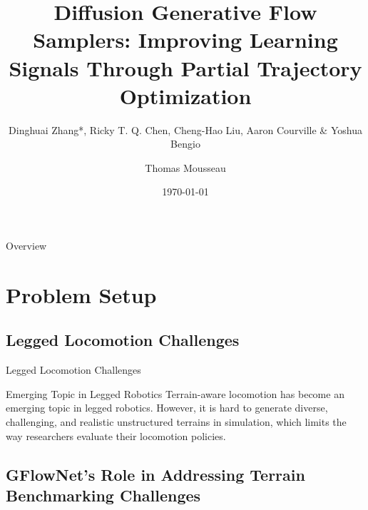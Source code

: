 \documentclass[aspectratio=169,xcolor=dvipsnames]{beamer}
\title{Diffusion Generative Flow Samplers: Improving Learning Signals Through Partial Trajectory Optimization}
\subtitle{Dinghuai Zhang*, Ricky T. Q. Chen, Cheng-Hao Liu, Aaron Courville \& Yoshua Bengio}
\author{Thomas Mousseau}
\date{\today} %
\begin{document}
\begin{frame}
    \vspace*{-2cm}
    \titlepage
\end{frame}

\begin{frame}{Overview}
    \tableofcontents
\end{frame}

\section{Problem Setup}

\subsection{Legged Locomotion Challenges}

\begin{frame}{Legged Locomotion Challenges}
    \begin{block}{Emerging Topic in Legged Robotics}
        Terrain-aware locomotion has become an emerging topic in legged robotics. However, it is hard to generate diverse, challenging, and realistic unstructured terrains in simulation, which limits the way researchers evaluate their locomotion policies.
    \end{block}

\end{frame}

\subsection{GFlowNet's Role in Addressing Terrain Benchmarking Challenges}
\end{document}
